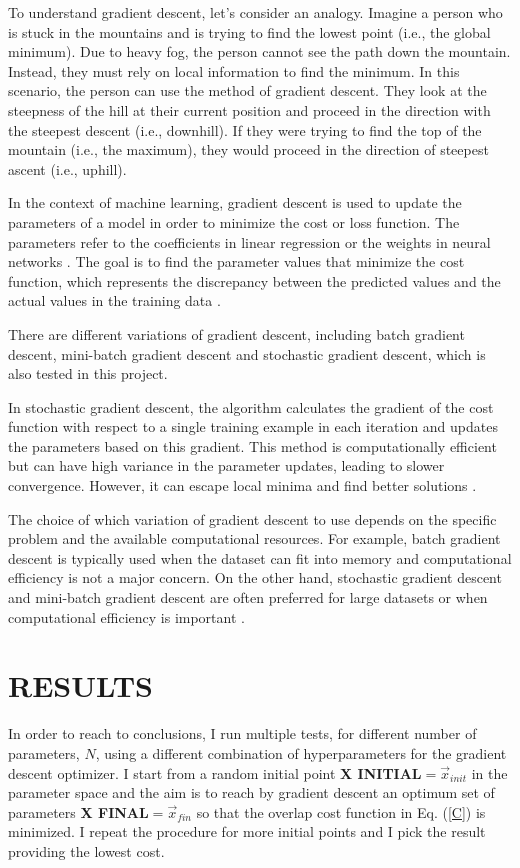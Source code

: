 \documentclass[inscr,ack,preface]{diphdthesis}
\begin{document}
To understand gradient descent, let's consider an analogy. Imagine a person who is stuck in the mountains and is trying to find the lowest point (i.e., the global minimum). Due to heavy fog, the person cannot see the path down the mountain. Instead, they must rely on local information to find the minimum. In this scenario, the person can use the method of gradient descent. They look at the steepness of the hill at their current position and proceed in the direction with the steepest descent (i.e., downhill). If they were trying to find the top of the mountain (i.e., the maximum), they would proceed in the direction of steepest ascent (i.e., uphill).

In the context of machine learning, gradient descent is used to update the parameters of a model in order to minimize the cost or loss function. The parameters refer to the coefficients in linear regression or the weights in neural networks \cite{gradient}. The goal is to find the parameter values that minimize the cost function, which represents the discrepancy between the predicted values and the actual values in the training data \cite{gd}.

There are different variations of gradient descent, including batch gradient descent, mini-batch gradient descent and stochastic gradient descent, which is also tested in this project.

In stochastic gradient descent, the algorithm calculates the gradient of the cost function with respect to a single training example in each iteration and updates the parameters based on this gradient. This method is computationally efficient but can have high variance in the parameter updates, leading to slower convergence. However, it can escape local minima and find better solutions \cite{gradient}.

The choice of which variation of gradient descent to use depends on the specific problem and the available computational resources. For example, batch gradient descent is typically used when the dataset can fit into memory and computational efficiency is not a major concern. On the other hand, stochastic gradient descent and mini-batch gradient descent are often preferred for large datasets or when computational efficiency is important \cite{gd}.

\chapter{RESULTS \label{results}}

In order to reach to conclusions, I run multiple tests, for different number of parameters, $N$, using a different combination of hyperparameters for the gradient descent optimizer. I start from a random initial point \textbf{X INITIAL}$=\vec{x}_{init}$ in the parameter space and the aim is to reach by gradient descent an optimum set of parameters \textbf{X FINAL}$=\vec{x}_{fin}$ so that the  overlap cost function in Eq. (\ref{C}) is minimized. I repeat the procedure for more initial points and I pick the result providing the lowest cost. 
\end{document}
